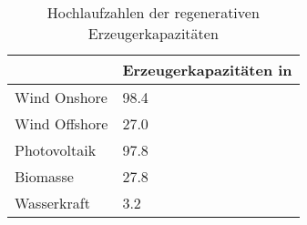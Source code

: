 {
\renewcommand{\arraystretch}{1.2}%
\begin{table}[H]
	\begin{center}
		\caption{Hochlaufzahlen der regenerativen Erzeugerkapazitäten}
		\begin{tabu} to 0.6\textwidth {X[1] X[2, r]}
			\toprule
			              & Erzeugerkapazitäten in \si{\gw} \\ \midrule
			Wind Onshore  & \num{98.4}                      \\
			Wind Offshore & \num{27.0}                      \\
			Photovoltaik  & \num{97.8}                      \\
			Biomasse      & \num{27.8}                      \\
			Wasserkraft   & \num{3.2}                       \\ \bottomrule
		\end{tabu}
		\label{tab:EE-RampUp}
	\end{center}
	\vspace{-3mm}%
\end{table}
}